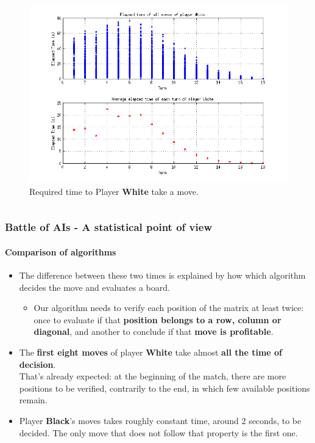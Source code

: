 \documentclass[10pt]{beamer}
\begin{document}
\begin{frame}
\begin{columns}
		\begin{figure}[h]
		\centering
		\includegraphics[scale=.26 ]{images/PENTAGOtimes}
		\caption{\centering Required time to Player \textbf{White} take a move.}
		\label{fig:gui}
		\end{figure}

	\end{columns}
\end{frame}

\begin{frame}
\frametitle{Battle of AIs - A statistical point of view}
\framesubtitle{Comparison of algorithms}

	\begin{itemize}
		
		\item The difference between these two times is explained by how which  
		algorithm decides the move and evaluates a board.
		  
		\begin{itemize}
			\item Our algorithm needs to verify each position of the matrix at least
			twice: once to evaluate if that \textbf{position belongs to a row, column or
			diagonal}, and another to conclude if that \textbf{move is profitable}.
		\end{itemize} 
		  
		
		 \item The \textbf{first eight moves} of player \textbf{White} take almost
		 \textbf{all the time of decision}.\\
		  That’s already expected: at the beginning of the  match, there are more
		  positions to be verified, contrarily to the end, in which few available
		  positions remain.
	
		\item Player \textbf{Black}'s moves takes roughly constant time, around 2
		seconds, to be decided. The only move that does not follow that property is the first one.
		 
	\end{itemize}


\end{frame}
\end{document}
